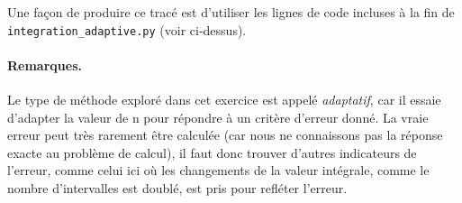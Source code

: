 \documentclass[%
oneside,                 %
final,                   %
10pt,french]{article}
\newenvironment{doconceexercise}{}{}
\begin{document}
\begin{doconceexercise}
Une façon de produire ce tracé est d'utiliser les lignes de code incluses à la fin de \Verb!integration_adaptive.py! (voir ci-dessus).




\paragraph{Remarques.}
Le type de méthode exploré dans cet exercice est appelé \emph{adaptatif}, car il essaie d'adapter la valeur de n pour répondre à un critère d'erreur donné. La vraie erreur peut très rarement être calculée (car nous ne connaissons pas la réponse exacte au problème de calcul), il faut donc trouver d'autres indicateurs de l'erreur, comme celui ici où les changements de la valeur intégrale, comme le nombre d'intervalles est doublé, est pris pour refléter l'erreur.


\end{doconceexercise}


\end{document}
